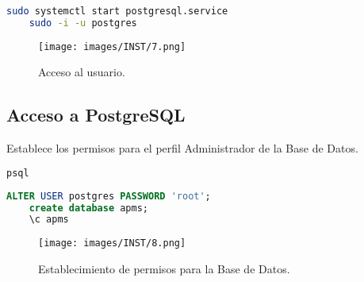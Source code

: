 \begin{lstlisting}[language=bash]
    sudo systemctl start postgresql.service
    sudo -i -u postgres
\end{lstlisting}

\begin{figure}[htbp!]
	\begin{center}
		\texttt{[image: images/INST/7.png]}
		\caption{Acceso al usuario.}
	\end{center}
\end{figure}

\subsection{Acceso a PostgreSQL}

Establece los permisos para el perfil Administrador de la Base de Datos.

\begin{lstlisting}[language=bash]
    psql
\end{lstlisting}
\begin{lstlisting}[language=SQL]
    ALTER USER postgres PASSWORD 'root';
    create database apms;
    \c apms
\end{lstlisting}

\begin{figure}[htbp!]
	\begin{center}
		\texttt{[image: images/INST/8.png]}
		\caption{Establecimiento de permisos para la Base de Datos.}
	\end{center}
\end{figure}